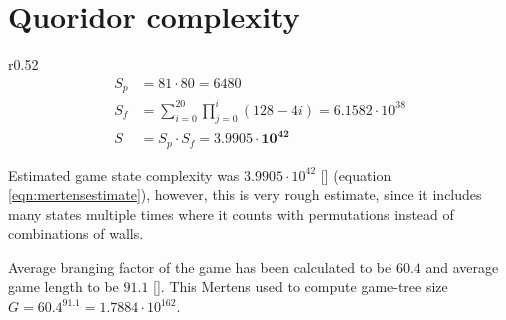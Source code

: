 \section{Quoridor complexity}
\begin{wrapfigure}{r}{0.52\textwidth}
  \vspace*{-2.35cm}
  \begin{equation}
    \label{eqn:mertensestimate}
    \begin{aligned}
      S_p\!&=\!81 \cdot 80 = 6480 \\
      S_f\!&=\!\sum_{i=0}^{20}\prod_{j=0}^{i}(128 - 4i)\!=\!6.1582{\cdot}10^{38} \\
      S\!&=\!S_p \cdot S_f = \mathbf{3.9905 \cdot 10 ^{42}}
    \end{aligned}
  \end{equation}
  \vspace*{-1.25cm}
\end{wrapfigure}

Estimated game state complexity was $3.9905\cdot10^{42}$
[\cite{mertens}] (equation \ref{eqn:mertensestimate}), however, this is very rough estimate, since
it includes many states multiple times where it counts with permutations
instead of combinations of walls.

Average branging factor of the game has been calculated to be $60.4$ and
average game length to be $91.1$ [\cite{glendenning}]. This Mertens used to
compute game-tree size $G = 60.4^{91.1} = 1.7884{\cdot}10^{162}$.

